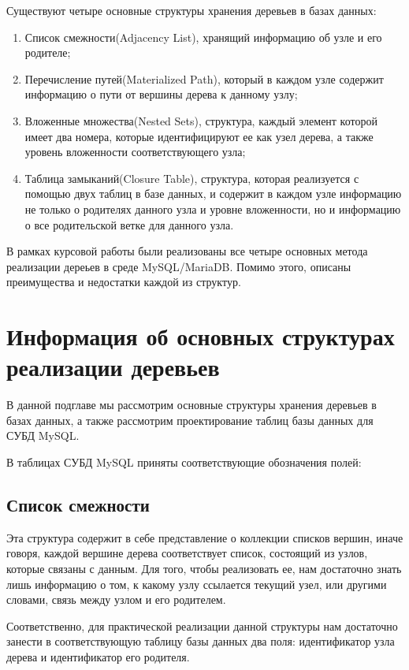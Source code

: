 \documentclass[a4paper,14pt]{extreport}
\theoremstyle{definition}
\begin{document}
Существуют четыре основные структуры хранения деревьев в базах данных\cite{Karwin}:
\begin{enumerate}
\item Список смежности(Adjacency List), хранящий информацию об узле и его родителе;
\item Перечисление путей(Materialized Path), который в каждом узле содержит информацию о пути от вершины дерева к данному узлу;
\item Вложенные множества(Nested Sets), структура, каждый элемент которой имеет два номера, которые идентифицируют ее как узел дерева, а также уровень вложенности соответствующего узла;
\item Таблица замыканий(Closure Table), структура, которая реализуется с помощью двух таблиц в базе данных, и содержит в каждом узле информацию не только о родителях данного узла и уровне вложенности, но и информацию о все родительской ветке для данного узла.
\end{enumerate}
В рамках курсовой работы были реализованы все четыре основных метода реализации дереьев в среде MySQL/MariaDB. Помимо этого, описаны преимущества и недостатки каждой из структур.
\section{Информация об основных структурах реализации деревьев}
В данной подглаве мы рассмотрим основные структуры хранения деревьев в базах данных, а также рассмотрим проектирование таблиц базы данных для СУБД MySQL.

В таблицах СУБД MySQL приняты соответствующие обозначения полей:

\subsection{Список смежности}
Эта структура содержит в себе представление о коллекции списков вершин, иначе говоря, каждой вершине дерева соответствует список, состоящий из узлов, которые связаны с данным\cite{Groshev}.  Для того, чтобы реализовать ее, нам достаточно знать лишь информацию о том, к какому узлу ссылается текущий узел, или другими словами, связь между узлом и его родителем.

Соответственно, для практической реализации данной структуры нам достаточно занести в соответствующую таблицу базы данных два поля: идентификатор узла дерева и идентификатор его родителя\cite{Ermakov}.
\end{document}
